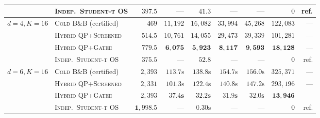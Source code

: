 \documentclass{article}
\theoremstyle{plain}
\theoremstyle{definition}
\begin{document}
\begin{table}[!htbp]
{\begin{tabular}{@{}llrrrrrrr@{}}
 & \textsc{Indep.\ Student-t OS} & $397.5$ & --- & $41.3$ & --- & --- & $0$ & ref. \\
\midrule
\multirow{4}{*}{$d=4, K=16$}
 & \textsc{Cold B\&B} (certified) & $469$ & $11{,}192$ & $16{,}082$ & $33{,}994$ & $45{,}268$ & $122{,}083$ & --- \\
 & \textsc{Hybrid QP+Screened} & $514.5$ & $10{,}761$ & $14{,}055$ & $29{,}473$ & $39{,}339$ & $101{,}281$ & --- \\
 & \textsc{Hybrid QP+Gated} & $779.5$ & $\mathbf{6{,}075}$ & $\mathbf{5{,}923}$ & $\mathbf{8{,}117}$ & $\mathbf{9{,}593}$ & $\mathbf{18{,}128}$ & --- \\
 & \textsc{Indep.\ Student-t OS} & $\mathbf{375.5}$ & --- & $52.8$ & --- & --- & $0$ & ref. \\
\midrule
\multirow{4}{*}{$d=6, K=16$}
 & \textsc{Cold B\&B} (certified) & $2{,}393$ & $113.7\text{s}$ & $138.8\text{s}$ & $154.7\text{s}$ & $156.0\text{s}$ & $325{,}371$ & --- \\
 & \textsc{Hybrid QP+Screened} & $2{,}331$ & $101.3\text{s}$ & $122.4\text{s}$ & $140.8\text{s}$ & $147.2\text{s}$ & $293{,}196$ & --- \\
 & \textsc{Hybrid QP+Gated} & $2{,}393$ & $\mathbf{37.4\text{s}}$ & $\mathbf{32.2\text{s}}$ & $\mathbf{31.9\text{s}}$ & $\mathbf{32.0\text{s}}$ & $\mathbf{13{,}946}$ & --- \\
 & \textsc{Indep.\ Student-t OS} & $\mathbf{1{,}998.5}$ & --- & $0.30\text{s}$ & --- & --- & $0$ & ref. \\
\bottomrule
\end{tabular}%
}
\end{table}
\end{document}
